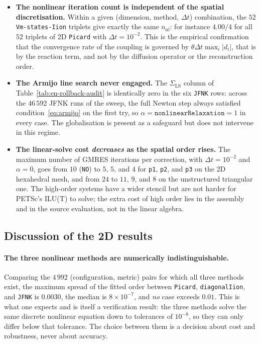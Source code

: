 \documentclass[11pt,a4paper]{article}
\newcommand{\code}[1]{\texttt{\small #1}}
\begin{document}
\begin{itemize}
\item \textbf{The nonlinear iteration count is independent of the spatial
discretisation.} Within a given (dimension, method, $\Delta t$) combination, the
$52$ \code{Vm-states-Iion} triplets give exactly the same $n_{\mathrm{nl}}$: for
instance $4.00/4$ for all $52$ triplets of 2D \code{Picard} with
$\Delta t=10^{-2}$. This is the empirical confirmation that the convergence rate
of the coupling is governed by $\theta\Delta t\max_i|d_i|$, that is by the
reaction term, and not by the diffusion operator or the reconstruction order.

\item \textbf{The Armijo line search never engaged.} The
$\Sigma_{\mathrm{LS}}$ column of Table~\ref{tab:en-rollback-audit} is identically
zero in the six \code{JFNK} rows: across the $46\,592$ JFNK runs of the sweep,
the full Newton step always satisfied condition~\eqref{eq:armijo} on the first
try, so $\alpha=\texttt{nonlinearRelaxation}=1$ in every case. The globalisation
is present as a safeguard but does not intervene in this regime.

\item \textbf{The linear-solve cost \emph{decreases} as the spatial order
rises.} The maximum number of GMRES iterations per correction, with
$\Delta t=10^{-2}$ and $\alpha=0$, goes from $10$ (\code{NO}) to $5$, $5$, and
$4$ for \code{p1}, \code{p2}, and \code{p3} on the 2D hexahedral mesh, and from
$24$ to $11$, $9$, and $8$ on the unstructured triangular one. The high-order
systems have a wider stencil but are not harder for PETSc's ILU(T) to solve; the
extra cost of high order lies in the assembly and in the source evaluation, not
in the linear algebra.
\end{itemize}



\FloatBarrier

\subsection{Discussion of the 2D results}
\label{sec:en-conclusions-2d}

\paragraph{The three nonlinear methods are numerically indistinguishable.}
Comparing the $4\,992$ (configuration, metric) pairs for which all three methods
exist, the maximum spread of the fitted order between \code{Picard},
\code{diagonalIion}, and \code{JFNK} is $0.0030$, the median is
$8\times10^{-7}$, and \emph{no} case exceeds $0.01$. This is what one expects and
is itself a verification result: the three methods solve the same discrete
nonlinear equation down to tolerances of $10^{-8}$, so they can only differ below
that tolerance. The choice between them is a decision about cost and robustness,
never about accuracy.
\end{document}
